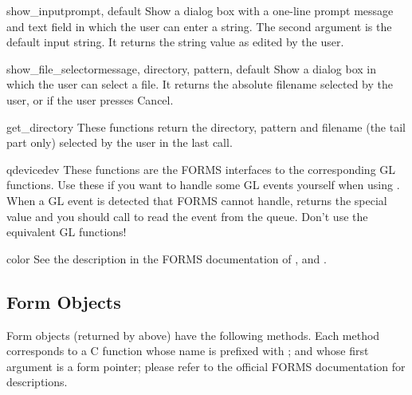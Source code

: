 \begin{funcdesc}{show_input}{prompt, default}
Show a dialog box with a one-line prompt message and text field in
which the user can enter a string.  The second argument is the default
input string.  It returns the string value as edited by the user.
\end{funcdesc}

\begin{funcdesc}{show_file_selector}{message, directory, pattern, default}
Show a dialog box in which the user can select a file.  It returns
the absolute filename selected by the user, or  if the user
presses Cancel.
\end{funcdesc}

\begin{funcdesc}{get_directory}{}
These functions return the directory, pattern and filename (the tail
part only) selected by the user in the last
 call.
\end{funcdesc}

\begin{funcdesc}{qdevice}{dev}
These functions are the FORMS interfaces to the corresponding GL
functions.  Use these if you want to handle some GL events yourself
when using .  When a GL event is detected that
FORMS cannot handle,  returns the special value
 and you should call  to read
the event from the queue.  Don't use the equivalent GL functions!
\end{funcdesc}

\begin{funcdesc}{color}{}
See the description in the FORMS documentation of
,  and
.
\end{funcdesc}

\subsection{Form Objects}
\label{form-objects}

Form objects (returned by  above) have the
following methods.  Each method corresponds to a C function whose
name is prefixed with ; and whose first argument is a form
pointer; please refer to the official FORMS documentation for
descriptions.

